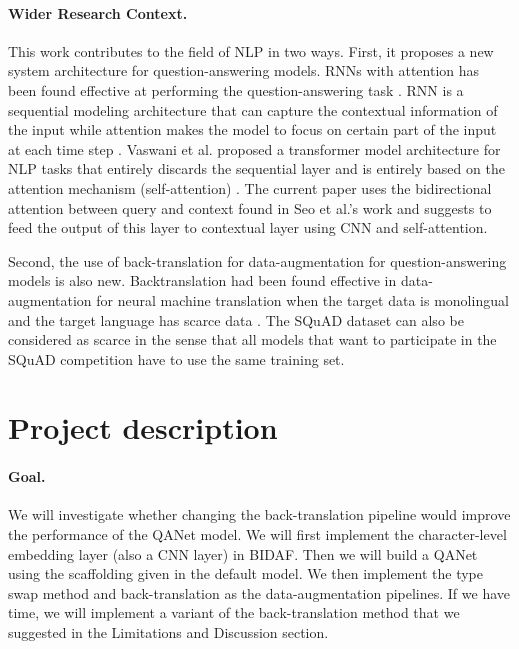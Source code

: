 \documentclass{article}
\begin{document}
\paragraph{Wider Research Context.}
This work contributes to the field of NLP in two ways. First, it proposes a new system architecture for question-answering models. RNNs with attention has been found effective at performing the question-answering task \cite{SEO}. RNN is a sequential modeling architecture that can capture the contextual information of the input while attention makes the model to focus on certain part of the input at each time step \cite{BAH}. Vaswani et al. proposed a transformer model architecture for NLP tasks that entirely discards the sequential layer and is entirely based on the attention mechanism (self-attention) \cite{VAS}. The current paper uses the bidirectional attention between query and context found in Seo et al.'s work and suggests to feed the output of this layer to contextual layer using CNN and self-attention.

Second, the use of back-translation for data-augmentation for question-answering models is also new. Backtranslation had been found effective in data-augmentation for neural machine translation when the target data is monolingual and the target language has scarce data \cite{SEN}. The SQuAD dataset can also be considered as scarce in the sense that all models that want to participate in the SQuAD competition have to use the same training set.  







\section{Project description}

\paragraph{Goal.} 
We will investigate whether changing the back-translation pipeline would improve the performance of the QANet model. We will first implement the character-level embedding layer (also a CNN layer) in BIDAF. Then we will build a QANet using the scaffolding given in the default model. We then implement the type swap method and back-translation as the data-augmentation pipelines. If we have time, we will implement a variant of the back-translation method that we suggested in the Limitations and Discussion section.
\end{document}
